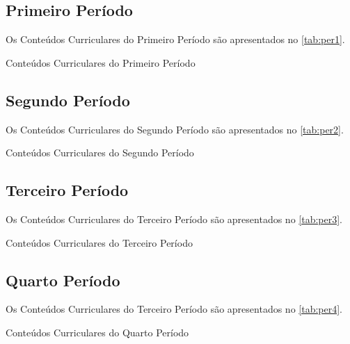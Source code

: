 \subsection{Primeiro Período}

Os Conteúdos Curriculares do Primeiro Período são apresentados no \autoref{tab:per1}.

\begin{table}[htb!]
	\centering\tiny
	\caption{Conteúdos Curriculares do Primeiro Período}
	
	\label{tab:per1}
\end{table}

\subsection{Segundo Período}

Os Conteúdos Curriculares do Segundo Período são apresentados no \autoref{tab:per2}.

\begin{table}[htb!]
	\centering\tiny
	\caption{Conteúdos Curriculares do Segundo Período}
	
	\label{tab:per2}
\end{table}

\subsection{Terceiro Período}

Os Conteúdos Curriculares do Terceiro Período são apresentados no \autoref{tab:per3}.

\begin{table}[htb!]
	\centering\tiny
	\caption{Conteúdos Curriculares do Terceiro Período}
	
	\label{tab:per3}
\end{table}

\subsection{Quarto Período}

Os Conteúdos Curriculares do Terceiro Período são apresentados no \autoref{tab:per4}.

\begin{table}[htb!]
	\centering\tiny
	\caption{Conteúdos Curriculares do Quarto Período}
	
	\label{tab:per4}
\end{table}

